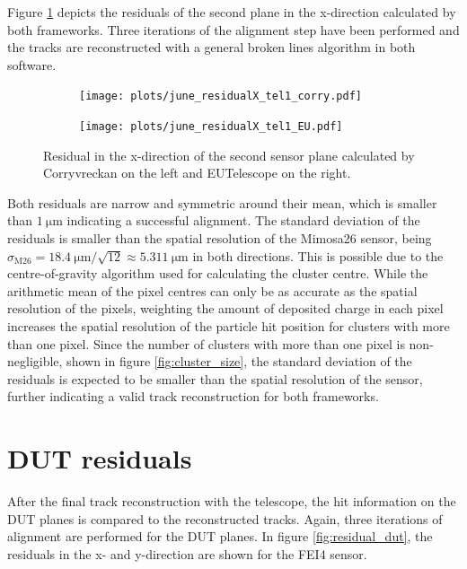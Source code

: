 Figure \ref{fig:residualX} depicts the residuals of the second plane in the x-direction calculated by both frameworks. Three iterations
of the alignment step have been performed and the tracks are reconstructed with a general broken lines algorithm in both software.

\begin{figure}
  \hspace{-1cm}
  \begin{subfigure}{0.53\textwidth}
      \texttt{[image: plots/june\_residualX\_tel1\_corry.pdf]}
  \end{subfigure}
  \begin{subfigure}{0.53\textwidth}
      \texttt{[image: plots/june\_residualX\_tel1\_EU.pdf]}
  \end{subfigure}
  \caption{Residual in the x-direction of the second sensor plane calculated by Corryvreckan on the left and EUTelescope on the right.}
  \label{fig:residualX}
\end{figure}

Both residuals are narrow and symmetric around their mean, which is smaller than $\SI{1}{\micro\meter}$ indicating a successful
alignment. The standard deviation of the residuals is smaller than the spatial resolution of the Mimosa26 sensor, being
$\sigma_{\text{M26}} = \SI{18.4}{\micro\meter}/\sqrt{12} \approx \SI{5.311}{\micro\meter}$ in both directions. This is possible due to
the centre-of-gravity algorithm used for calculating the cluster centre. While the arithmetic mean of the pixel centres can
only be as accurate as the spatial resolution of the pixels, weighting the amount of deposited charge in each pixel increases the
spatial resolution of the particle hit position for clusters with more than one pixel. Since the number of clusters with more than
one pixel is non-negligible, shown in figure \ref{fig:cluster_size}, the standard deviation of the residuals is expected to be
smaller than the spatial resolution of the sensor, further indicating a valid track reconstruction for both frameworks.

\section{DUT residuals}
After the final track reconstruction with the telescope, the hit information on the DUT planes is compared to the
reconstructed tracks. Again, three iterations of alignment are performed for the DUT planes. In figure \ref{fig:residual_dut}, the residuals in the
x- and y-direction are shown for the FEI4 sensor.

